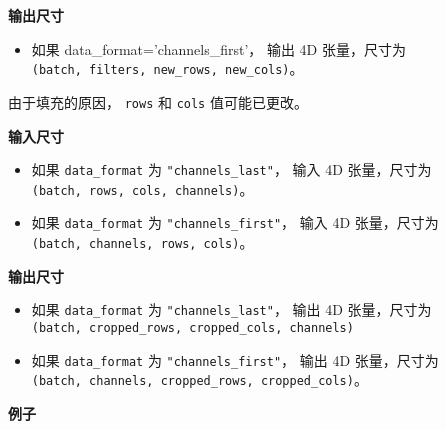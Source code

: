 \textbf{输出尺寸}

\begin{itemize}
\tightlist
\item
  如果 data\_format='channels\_first'， 输出 4D 张量，尺寸为
  \texttt{(batch,\ filters,\ new\_rows,\ new\_cols)}。
\end{itemize}

由于填充的原因， \texttt{rows} 和 \texttt{cols} 值可能已更改。

\textbf{输入尺寸}

\begin{itemize}
\tightlist
\item
  如果 \texttt{data\_format} 为 \texttt{"channels\_last"}， 输入 4D
  张量，尺寸为 \texttt{(batch,\ rows,\ cols,\ channels)}。
\item
  如果 \texttt{data\_format} 为 \texttt{"channels\_first"}， 输入 4D
  张量，尺寸为 \texttt{(batch,\ channels,\ rows,\ cols)}。
\end{itemize}

\textbf{输出尺寸}

\begin{itemize}
\tightlist
\item
  如果 \texttt{data\_format} 为 \texttt{"channels\_last"}， 输出 4D
  张量，尺寸为
  \texttt{(batch,\ cropped\_rows,\ cropped\_cols,\ channels)}
\item
  如果 \texttt{data\_format} 为 \texttt{"channels\_first"}， 输出 4D
  张量，尺寸为
  \texttt{(batch,\ channels,\ cropped\_rows,\ cropped\_cols)}。
\end{itemize}

\textbf{例子}

\begin{Shaded}
\begin{Highlighting}[]
\OperatorTok{=} 
\OperatorTok{=}\NormalTok{((}\NormalTok{, }\NormalTok{), (}\NormalTok{, }\NormalTok{)),}
                     \OperatorTok{=}\NormalTok{(}\NormalTok{, }\NormalTok{, }\NormalTok{)))}
\NormalTok{, (}\NormalTok{, }\OperatorTok{=}\NormalTok{))}
\OperatorTok{=}\NormalTok{((}\NormalTok{, }\NormalTok{), (}\NormalTok{, }\NormalTok{))))}
\end{Highlighting}
\end{Shaded}



